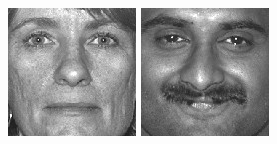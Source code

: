 \begin{figure}[ht]
\begin{center}
  \includegraphics[width=\columnwidth/10]{ch5/figures/feret27.jpg}
  \includegraphics[width=\columnwidth/10]{ch5/figures/feret28.jpg}  

\end{center}
\end{figure}
